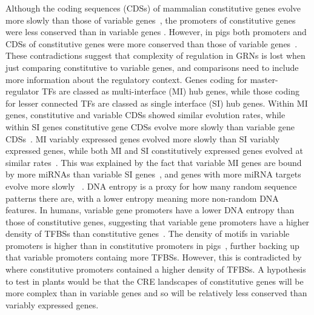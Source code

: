 Although the coding sequences (CDSs) of mammalian constitutive genes evolve more slowly than those of variable genes~\autocite{zhangMammalianHousekeepingGenes2004}, the promoters of constitutive genes were less conserved than in variable genes \autocite{farreHousekeepingGenesTend2007}.
However, in pigs both promoters and CDSs of constitutive genes were more conserved than those of variable genes~\autocite{weiCharacterizationGenePromoters2019}.
These contradictions suggest that complexity of regulation in GRNs is lost when just comparing constitutive to variable genes, and comparisons need to include more information about the regulatory context.
Genes coding for master-regulator TFs are classed as multi\hyp{}interface (MI) hub genes, while those coding for lesser connected TFs are classed as single interface (SI) hub genes.
Within MI genes, constitutive and variable CDSs showed similar evolution rates, while within SI genes constitutive gene CDSs evolve more slowly than variable gene CDSs~\autocite{podderMultifunctionalityDominantlyDetermines2009}.
MI variably expressed genes evolved more slowly than SI variably expressed genes, while both MI and SI constitutively expressed genes evolved at similar rates~\autocite{biswasEvolutionaryRateHeterogeneity2018}.
This was explained by the fact that variable MI genes are bound by more miRNAs than variable SI genes~\autocite{biswasEvolutionaryRateHeterogeneity2018}, and genes with more miRNA targets evolve more slowly ~\autocite{chengRelationshipEvolutionMicroRNA2009}.
DNA entropy is a proxy for how many random sequence patterns there are, with a lower entropy meaning more non-random DNA features.
In humans, variable gene promoters have a lower DNA entropy than those of constitutive genes, suggesting that variable gene promoters have a higher density of TFBSs than constitutive genes~\autocite{thomasDNAEntropyReveals2015}.
The density of motifs in variable promoters is higher than in constitutive promoters in pigs~\autocite{weiCharacterizationGenePromoters2019}, further backing up that variable promoters containg more TFBSs.
However, this is contradicted by \textcite{mattioliHighthroughputFunctionalAnalysis2019} where constitutive promoters contained a higher density of TFBSs.
A hypothesis to test in plants would be that the CRE landscapes of constitutive genes will be more complex than in variable genes and so will be relatively less conserved than variably expressed genes.

